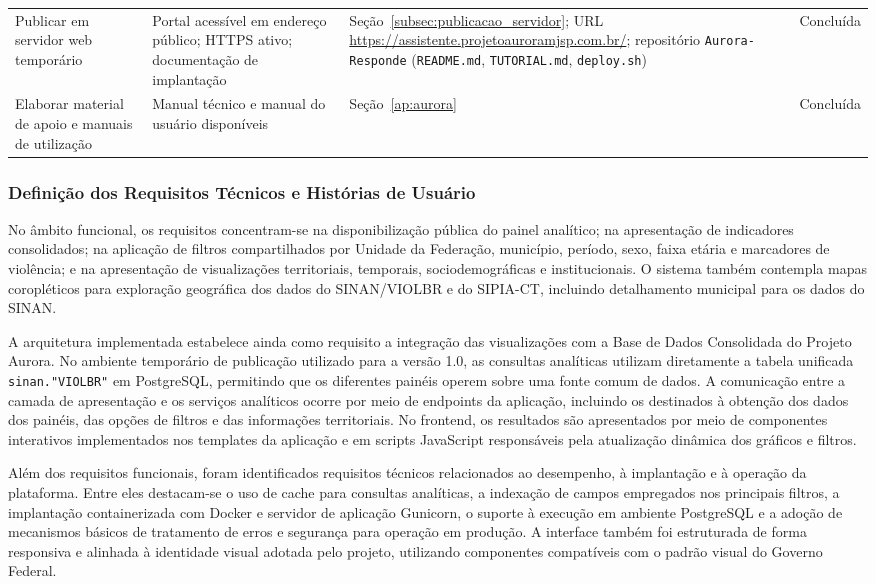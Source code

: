\documentclass[11pt,a4paper]{article}
\begin{document}
\begin{table}[H]
\begin{tabularx}{\textwidth}{@{}P{3.6cm}P{4.4cm}P{4.2cm}P{2.8cm}@{}}
Publicar em servidor web temporário &
Portal acessível em endereço público; HTTPS ativo; documentação de implantação &
Seção~\ref{subsec:publicacao_servidor}; URL \url{https://assistente.projetoauroramjsp.com.br/}; repositório \texttt{Aurora-Responde} (\texttt{README.md}, \texttt{TUTORIAL.md}, \texttt{deploy.sh}) &
Concluída \\

Elaborar material de apoio e manuais de utilização &
Manual técnico e manual do usuário disponíveis &
Seção~\ref{ap:aurora} & 
Concluída \\

\bottomrule
\end{tabularx}
\end{table}

\subsubsection{Definição dos Requisitos Técnicos e Histórias de Usuário}
\label{subsubsec:requisitos_historias_meta3}

No âmbito funcional, os requisitos concentram-se na disponibilização pública do painel analítico; na apresentação de indicadores consolidados; na aplicação de filtros compartilhados por Unidade da Federação, município, período, sexo, faixa etária e marcadores de violência; e na apresentação de visualizações territoriais, temporais, sociodemográficas e institucionais. O sistema também contempla mapas coropléticos para exploração geográfica dos dados do SINAN/VIOLBR e do SIPIA-CT, incluindo detalhamento municipal para os dados do SINAN.

A arquitetura implementada estabelece ainda como requisito a integração das visualizações com a Base de Dados Consolidada do Projeto Aurora. No ambiente temporário de publicação utilizado para a versão 1.0, as consultas analíticas utilizam diretamente a tabela unificada \texttt{sinan."VIOLBR"} em PostgreSQL, permitindo que os diferentes painéis operem sobre uma fonte comum de dados. A comunicação entre a camada de apresentação e os serviços analíticos ocorre por meio de endpoints da aplicação, incluindo os destinados à obtenção dos dados dos painéis, das opções de filtros e das informações territoriais. No frontend, os resultados são apresentados por meio de componentes interativos implementados nos templates da aplicação e em scripts JavaScript responsáveis pela atualização dinâmica dos gráficos e filtros.

Além dos requisitos funcionais, foram identificados requisitos técnicos relacionados ao desempenho, à implantação e à operação da plataforma. Entre eles destacam-se o uso de cache para consultas analíticas, a indexação de campos empregados nos principais filtros, a implantação containerizada com Docker e servidor de aplicação Gunicorn, o suporte à execução em ambiente PostgreSQL e a adoção de mecanismos básicos de tratamento de erros e segurança para operação em produção. A interface também foi estruturada de forma responsiva e alinhada à identidade visual adotada pelo projeto, utilizando componentes compatíveis com o padrão visual do Governo Federal.
\end{document}
